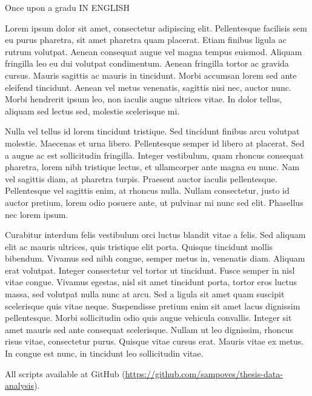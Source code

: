 \justify
Once upon a gradu IN ENGLISH

Lorem ipsum dolor sit amet, consectetur adipiscing elit. Pellentesque facilisis sem eu purus pharetra, sit amet pharetra quam placerat. Etiam finibus ligula ac rutrum volutpat. Aenean consequat augue vel magna tempus euismod. Aliquam fringilla leo eu dui volutpat condimentum. Aenean fringilla tortor ac gravida cursus. Mauris sagittis ac mauris in tincidunt. Morbi accumsan lorem sed ante eleifend tincidunt. Aenean vel metus venenatis, sagittis nisi nec, auctor nunc. Morbi hendrerit ipsum leo, non iaculis augue ultrices vitae. In dolor tellus, aliquam sed lectus sed, molestie scelerisque mi.

Nulla vel tellus id lorem tincidunt tristique. Sed tincidunt finibus arcu volutpat molestie. Maecenas et urna libero. Pellentesque semper id libero at placerat. Sed a augue ac est sollicitudin fringilla. Integer vestibulum, quam rhoncus consequat pharetra, lorem nibh tristique lectus, et ullamcorper ante magna eu nunc. Nam vel sagittis diam, at pharetra turpis. Praesent auctor iaculis pellentesque. Pellentesque vel sagittis enim, at rhoncus nulla. Nullam consectetur, justo id auctor pretium, lorem odio posuere ante, ut pulvinar mi nunc sed elit. Phasellus nec lorem ipsum.

Curabitur interdum felis vestibulum orci luctus blandit vitae a felis. Sed aliquam elit ac mauris ultrices, quis tristique elit porta. Quisque tincidunt mollis bibendum. Vivamus sed nibh congue, semper metus in, venenatis diam. Aliquam erat volutpat. Integer consectetur vel tortor ut tincidunt. Fusce semper in nisl vitae congue. Vivamus egestas, nisl sit amet tincidunt porta, tortor eros luctus massa, sed volutpat nulla nunc at arcu. Sed a ligula sit amet quam suscipit scelerisque quis vitae neque. Suspendisse pretium enim sit amet lacus dignissim pellentesque. Morbi sollicitudin odio quis augue vehicula convallis. Integer sit amet mauris sed ante consequat scelerisque. Nullam ut leo dignissim, rhoncus risus vitae, consectetur purus. Quisque vitae cursus erat. Mauris vitae ex metus. In congue est nunc, in tincidunt leo sollicitudin vitae.

All scripts available at GitHub (\textcolor{blue}{\url{https://github.com/sampoves/thesis-data-analysis}}).